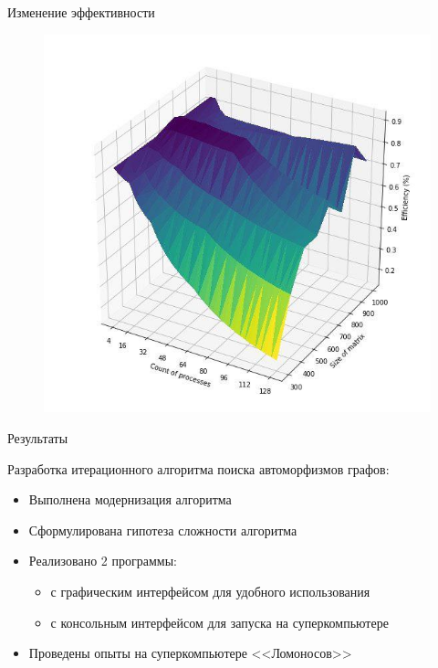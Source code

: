 \documentclass{beamer}
\begin{document}
\begin{frame}{Изменение эффективности}

\begin{figure}[ht]
\centering 
    \includegraphics[scale=0.4]{../image/ef.jpg}
\end{figure}

\end{frame}


\begin{frame}{Результаты}

Разработка итерационного алгоритма поиска автоморфизмов графов:
\begin{itemize}
\item Выполнена модернизация алгоритма
\item Сформулирована гипотеза сложности алгоритма
\item Реализовано 2 программы:
\begin{itemize}
\item с графическим интерфейсом для удобного использования
\item с консольным интерфейсом для запуска на суперкомпьютере
\end{itemize}
\item Проведены опыты на суперкомпьютере <<Ломоносов>>
\end{itemize}

\end{frame}
\end{document}
